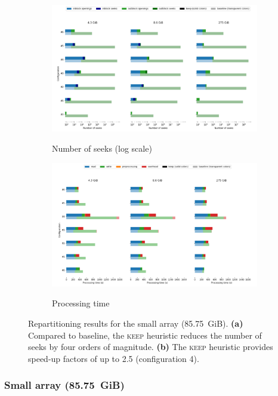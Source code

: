 \documentclass[sigconf, nonacm]{acmart}
\newcommand{\keep}[0]{\textsc{keep}\xspace}
\begin{document}
\begin{figure}
  \centering
  \begin{subfigure}{\textwidth}
    \caption{Number of seeks (log scale)}
    \includegraphics[scale=0.45]{./figures/seeks_3500.png}
    \label{fig:seeks_3500}
  \end{subfigure}
  \begin{subfigure}{\textwidth}
    \caption{Processing time}
   \includegraphics[scale=0.45]{./figures/time_3500.png}
  \label{fig:time_3500}
  \end{subfigure}
  \caption{Repartitioning results for the small array (85.75~GiB). \textbf{(a)} Compared to baseline, the \keep heuristic
  reduces the number of seeks by four orders of magnitude. \textbf{(b)} The \keep heuristic provides speed-up factors of up to 2.5 (configuration 4).}
  \label{fig:3500}
\end{figure}


\subsubsection{Small array (85.75~GiB)}
\end{document}
